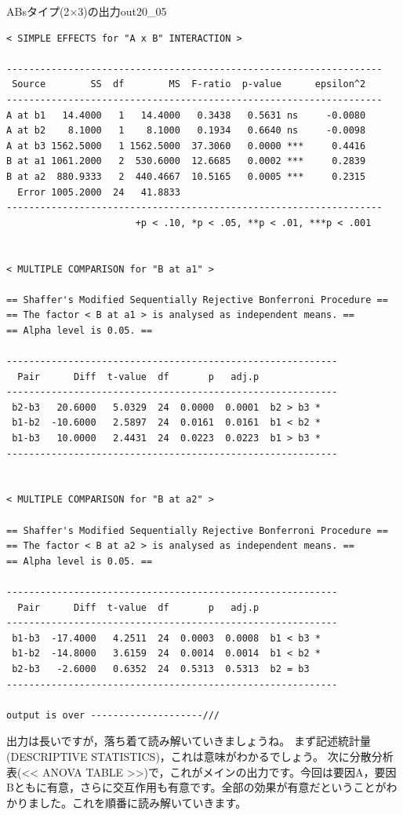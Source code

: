 \documentclass{ltjbook}
\begin{document}
\begin{Rscreen}{ABsタイプ(2$\times$3)の出力}{out20_05}
\begin{verbatim}
< SIMPLE EFFECTS for "A x B" INTERACTION >

-------------------------------------------------------------------
 Source        SS  df        MS  F-ratio  p-value      epsilon^2 
-------------------------------------------------------------------
A at b1   14.4000   1   14.4000   0.3438   0.5631 ns     -0.0080 
A at b2    8.1000   1    8.1000   0.1934   0.6640 ns     -0.0098 
A at b3 1562.5000   1 1562.5000  37.3060   0.0000 ***     0.4416 
B at a1 1061.2000   2  530.6000  12.6685   0.0002 ***     0.2839 
B at a2  880.9333   2  440.4667  10.5165   0.0005 ***     0.2315 
  Error 1005.2000  24   41.8833                                  
-------------------------------------------------------------------
                       +p < .10, *p < .05, **p < .01, ***p < .001


< MULTIPLE COMPARISON for "B at a1" >

== Shaffer's Modified Sequentially Rejective Bonferroni Procedure ==
== The factor < B at a1 > is analysed as independent means. == 
== Alpha level is 0.05. == 
 
-----------------------------------------------------------
  Pair      Diff  t-value  df       p   adj.p            
-----------------------------------------------------------
 b2-b3   20.6000   5.0329  24  0.0000  0.0001  b2 > b3 * 
 b1-b2  -10.6000   2.5897  24  0.0161  0.0161  b1 < b2 * 
 b1-b3   10.0000   2.4431  24  0.0223  0.0223  b1 > b3 * 
-----------------------------------------------------------


< MULTIPLE COMPARISON for "B at a2" >

== Shaffer's Modified Sequentially Rejective Bonferroni Procedure ==
== The factor < B at a2 > is analysed as independent means. == 
== Alpha level is 0.05. == 
 
-----------------------------------------------------------
  Pair      Diff  t-value  df       p   adj.p            
-----------------------------------------------------------
 b1-b3  -17.4000   4.2511  24  0.0003  0.0008  b1 < b3 * 
 b1-b2  -14.8000   3.6159  24  0.0014  0.0014  b1 < b2 * 
 b2-b3   -2.6000   0.6352  24  0.5313  0.5313  b2 = b3   
-----------------------------------------------------------

output is over --------------------///
\end{verbatim}
\end{Rscreen}

出力は長いですが，落ち着て読み解いていきましょうね。
まず記述統計量(DESCRIPTIVE STATISTICS)，これは意味がわかるでしょう。
次に分散分析表(<< ANOVA TABLE >>)で，これがメインの出力です。今回は要因A，要因Bともに有意，さらに交互作用も有意です。全部の効果が有意だということがわかりました。これを順番に読み解いていきます。
\end{document}
